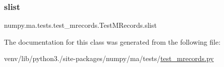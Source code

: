 \subsubsection{\texorpdfstring{slist}{slist}}
{\footnotesize\ttfamily numpy.\+ma.\+tests.\+test\+\_\+mrecords.\+Test\+M\+Records.\+slist\hspace{0.3cm}{\ttfamily [static]}}



The documentation for this class was generated from the following file\+:\begin{DoxyCompactItemize}
\item 
venv/lib/python3./site-\/packages/numpy/ma/tests/\hyperlink{test__mrecords_8py}{test\+\_\+mrecords.\+py}\end{DoxyCompactItemize}
